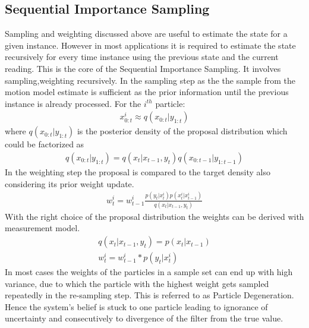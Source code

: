 \subsection{Sequential Importance Sampling}
Sampling and weighting discussed above are useful to estimate the state for a given instance. However in most applications it is required to estimate the state recursively for every time instance using the previous state and the current reading. This is the core of the Sequential Importance Sampling. It involves sampling,weighting recursively. In the sampling step as the the sample from the motion model estimate is sufficient as the prior information until the previous instance is already processed.
For the ${i}^{th}$ particle:
\begin{gather} \label{SIS_Sample}
    x_{0:t}^{i} \approx q(x_{0:t}| y_{1:t}) 
\end{gather}
where ${q(x_{0:t}| y_{1:t})}$ is the posterior density of the proposal distribution which could be factorized as 
\begin{gather} \label{SIS_propfact}
    q(x_{0:t}| y_{1:t}) = q(x_t|x_{t-1},y_{t}) q(x_{0:t-1}| y_{1:t-1}) 
\end{gather}
In the weighting step the proposal is compared to the target density also considering its prior weight update. 
\begin{gather} \label{SIS_weight}
    w_{t}^{i} = w_{t-1}^{i} \frac{p(y_{t}|x_{t}^{i}) p(x_{t}^{i}|x_{t-1}^{i})}{q(x_t|x_{t-1},y_{t})}  
\end{gather}
With the right choice of the proposal distribution the weights can be derived with measurement model.
\begin{gather} \label{SIS_weightprop}
    q(x_t|x_{t-1},y_{t}) = p(x_t|x_{t-1})\\
    w_{t}^{i} = w_{t-1}^{i} * p(y_{t}|x_{t}^{i})
\end{gather}
In most cases the weights of the particles in a sample set can end up with high variance, due to which the particle with the highest weight gets sampled repeatedly in the re-sampling step. This is referred to as Particle Degeneration. Hence the system's belief is stuck to one particle leading to ignorance of uncertainty and consecutively to divergence of the filter from the true value.

